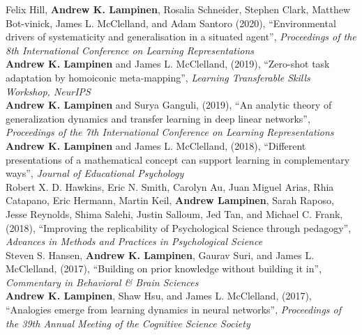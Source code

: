 \documentclass[margin]{res}
\begin{document}
\begin{resume}
Felix Hill, \textbf{Andrew K. Lampinen}, Rosalia Schneider, Stephen Clark, Matthew Bot-vinick, James L. McClelland, and Adam Santoro (2020), {``Environmental drivers of systematicity and generalisation in a situated agent'',} \textit{Proceedings of the 8th International Conference on Learning Representations} \\ [3pt] 
\textbf{Andrew K. Lampinen} and James L. McClelland, (2019), {``Zero-shot task adaptation by homoiconic meta-mapping'',} \textit{Learning Transferable Skills Workshop, NeurIPS} \\ [3pt] 
\textbf{Andrew K. Lampinen} and Surya Ganguli, (2019), {``An analytic theory of generalization dynamics and transfer learning in deep linear networks'',} \textit{Proceedings of the 7th International Conference on Learning Representations} \\[3pt] 
\textbf{Andrew K. Lampinen} and James L. McClelland, (2018), {``Different presentations of a mathematical concept can support learning in complementary ways'',} \textit{Journal of Educational Psychology} \\[3pt]
 Robert X. D. Hawkins, Eric N. Smith, Carolyn Au, Juan Miguel Arias, Rhia Catapano, Eric Hermann, Martin Keil, \textbf{Andrew Lampinen}, Sarah Raposo, Jesse Reynolds, Shima Salehi, Justin Salloum, Jed Tan, and Michael C. Frank, (2018), {``Improving the replicability of Psychological Science through pedagogy'',}  \textit{Advances in Methods and Practices in Psychological Science} \\ [3pt]
Steven S. Hansen, \textbf{Andrew K. Lampinen}, Gaurav Suri, and James L. McClelland, (2017), {``Building on prior knowledge without building it in'',} \textit{Commentary in Behavioral \& Brain Sciences}  \\[3pt]
\textbf{Andrew K. Lampinen}, Shaw Hsu, and James L. McClelland, (2017), {``Analogies emerge from learning dynamics in neural networks'',} \textit{Proceedings of the 39th Annual Meeting of the Cognitive Science Society}  


\end{resume}
\end{document}
